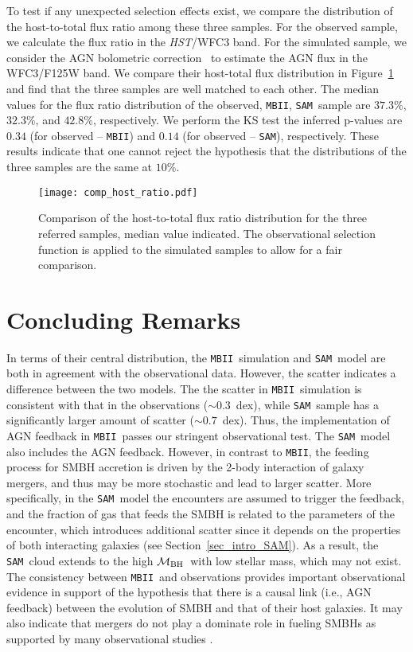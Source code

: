 \documentclass[twocolumn,trackchanges]{aastex63}
\newcommand{\hst}{{\it HST}}
\newcommand{\mbh}{$\mathcal M_{\rm BH}$}
\newcommand{\sam}{\texttt{SAM}}
\newcommand{\mbii}{\texttt{MBII}}
\begin{document}
To test if any unexpected selection effects exist, we compare the distribution of the host-to-total flux ratio among these three samples. For the observed sample, we calculate the flux ratio in the \hst/WFC3 band. For the simulated sample, we consider the AGN bolometric correction~\citep{Elvis1994} to estimate the AGN flux in the WFC3/F125W band. We compare their host-total flux distribution in Figure~\ref{fig:comp_hist} and find that the three samples are well matched to each other. The median values for the flux ratio distribution of the observed, \mbii, \sam\ sample are $37.3\%$, $32.3\%$, and $42.8\%$, respectively. We perform the KS test the inferred p-values are $0.34$ (for observed -- \mbii) and $0.14$ (for observed -- \sam), respectively. These results indicate that one cannot reject the hypothesis that the distributions of the three samples are the same at $10\%$.

\begin{figure}[t]
\texttt{[image: comp\_host\_ratio.pdf]}
\caption{Comparison of the host-to-total flux ratio distribution for the three referred samples, median value indicated. The observational selection function is applied to the simulated samples to allow for a fair comparison.
}
\label{fig:comp_hist}
\end{figure}

\section{Concluding Remarks}
\label{sec:conclusion}
In terms of their central distribution, the \mbii\ simulation and \sam\ model are both in agreement with the observational data. However, the scatter indicates a difference between the two models. The  the scatter in \mbii\ simulation is consistent with that in the observations ($\sim0.3$~dex), while \sam\ sample has a significantly larger amount of scatter ($\sim0.7$~dex). Thus, the implementation of AGN feedback in \mbii\ passes our stringent observational test. The \sam\ model also includes the AGN feedback. However, in contrast to \mbii, the feeding process for SMBH accretion is driven by the 2-body interaction of galaxy mergers, and thus may be more stochastic and lead to larger scatter. More specifically, in the \sam\ model the encounters are assumed to trigger the feedback, and the fraction of gas that feeds the SMBH is related to the parameters of the encounter, which introduces additional scatter since it depends on the properties of both interacting galaxies (see Section~\ref{sec_intro_SAM}). As a result, the \sam\ cloud extends to the high \mbh\ with low stellar mass, which may not exist. The consistency between \mbii\ and observations provides important observational evidence in support of the hypothesis that there is a causal link (i.e., AGN feedback) between the evolution of SMBH and that of their host galaxies. It may also indicate that mergers do not play a dominate role in fueling SMBHs as supported by many observational studies \citep{Ellison2011, Silverman2011,Mechtley2016,Goulding2018}.
\end{document}
